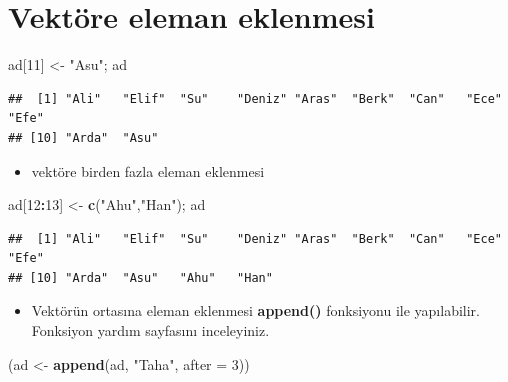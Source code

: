 \documentclass[
  oneside]{book}
\newenvironment{Shaded}{\begin{snugshade}}{\end{snugshade}}
\newcommand{\AttributeTok}[1]{\textcolor[rgb]{0.13,0.29,0.53}{#1}}
\newcommand{\DecValTok}[1]{\textcolor[rgb]{0.00,0.00,0.81}{#1}}
\newcommand{\FunctionTok}[1]{\textcolor[rgb]{0.13,0.29,0.53}{\textbf{#1}}}
\newcommand{\NormalTok}[1]{#1}
\newcommand{\OtherTok}[1]{\textcolor[rgb]{0.56,0.35,0.01}{#1}}
\newcommand{\SpecialCharTok}[1]{\textcolor[rgb]{0.81,0.36,0.00}{\textbf{#1}}}
\newcommand{\StringTok}[1]{\textcolor[rgb]{0.31,0.60,0.02}{#1}}
\providecommand{\tightlist}{%
  \setlength{\itemsep}{0pt}\setlength{\parskip}{0pt}}
\begin{document}
\hypertarget{vektuxf6re-eleman-eklenmesi}{%
\section{Vektöre eleman eklenmesi}\label{vektuxf6re-eleman-eklenmesi}}

\begin{Shaded}
\begin{Highlighting}[]
\NormalTok{ad[}\DecValTok{11}\NormalTok{] }\OtherTok{\textless{}{-}} \StringTok{"Asu"}\NormalTok{; ad}
\end{Highlighting}
\end{Shaded}

\begin{verbatim}
##  [1] "Ali"   "Elif"  "Su"    "Deniz" "Aras"  "Berk"  "Can"   "Ece"   "Efe"  
## [10] "Arda"  "Asu"
\end{verbatim}

\begin{itemize}
\tightlist
\item
  vektöre birden fazla eleman eklenmesi
\end{itemize}

\begin{Shaded}
\begin{Highlighting}[]
\NormalTok{ad[}\DecValTok{12}\SpecialCharTok{:}\DecValTok{13}\NormalTok{] }\OtherTok{\textless{}{-}} \FunctionTok{c}\NormalTok{(}\StringTok{"Ahu"}\NormalTok{,}\StringTok{"Han"}\NormalTok{); ad}
\end{Highlighting}
\end{Shaded}

\begin{verbatim}
##  [1] "Ali"   "Elif"  "Su"    "Deniz" "Aras"  "Berk"  "Can"   "Ece"   "Efe"  
## [10] "Arda"  "Asu"   "Ahu"   "Han"
\end{verbatim}

\begin{itemize}
\tightlist
\item
  Vektörün ortasına eleman eklenmesi \textbf{append()} fonksiyonu ile yapılabilir. Fonksiyon yardım sayfasını inceleyiniz.
\end{itemize}

\begin{Shaded}
\begin{Highlighting}[]
\NormalTok{(ad }\OtherTok{\textless{}{-}} \FunctionTok{append}\NormalTok{(ad, }\StringTok{"Taha"}\NormalTok{, }\AttributeTok{after =} \DecValTok{3}\NormalTok{))}
\end{Highlighting}
\end{Shaded}
\end{document}
